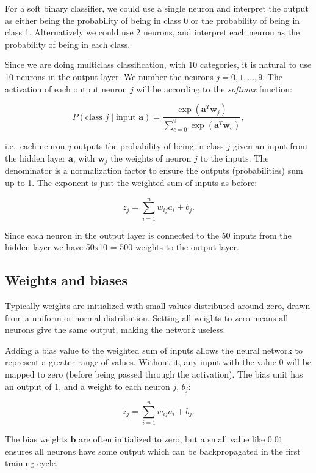 \documentclass[%
oneside,                 %
final,                   %
10pt]{article}
\begin{document}
For a soft binary classifier, we could use a single neuron and interpret the output as either being the probability of being in class 0 or the probability of being in class 1. Alternatively we could use 2 neurons, and interpret each neuron as the probability of being in each class.  

Since we are doing multiclass classification, with 10 categories, it is natural to use 10 neurons in the output layer. We number the neurons $j = 0,1,...,9$. The activation of each output neuron $j$ will be according to the \emph{softmax} function:  

$$ P(\text{class $j$} \mid \text{input $\bm{a}$}) = \frac{\exp{(\bm{a}^T \bm{w}_j)}}
{\sum_{c=0}^{9} \exp{(\bm{a}^T \bm{w}_c)}} ,$$  

i.e.~each neuron $j$ outputs the probability of being in class $j$ given an input from the hidden layer $\bm{a}$, with $\bm{w}_j$ the weights of neuron $j$ to the inputs.  
The denominator is a normalization factor to ensure the outputs (probabilities) sum up to 1.  
The exponent is just the weighted sum of inputs as before:  

$$ z_j = \sum_{i=1}^n w_ {ij} a_i+b_j.$$  

Since each neuron in the output layer is connected to the 50 inputs from the hidden layer we have 50x10 = 500
weights to the output layer.

\subsection{Weights and biases}

Typically weights are initialized with small values distributed around zero, drawn from a uniform
or normal distribution. Setting all weights to zero means all neurons give the same output, making the network useless.  

Adding a bias value to the weighted sum of inputs allows the neural network to represent a greater range
of values. Without it, any input with the value 0 will be mapped to zero (before being passed through the activation). The bias unit has an output of 1, and a weight to each neuron $j$, $b_j$:  

$$ z_j = \sum_{i=1}^n w_ {ij} a_i + b_j.$$  

The bias weights $\bm{b}$ are often initialized to zero, but a small value like $0.01$ ensures all neurons have some output which can be backpropagated in the first training cycle.
\end{document}
